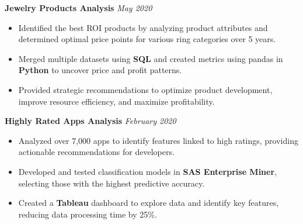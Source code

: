 \documentclass[10pt,a4paper]{article}
\begin{document}







\spacedhrule{0em}{-1em}


\headedsection
{\textbf{Jewelry Products Analysis}}
{{\hfill\emph{May 2020}}}
{
  {
    \begin{itemize}
      \item Identified the best ROI products by analyzing product attributes and determined optimal price points for various ring categories over 5 years.
      \item Merged multiple datasets using \textbf{SQL} and created metrics using pandas in \textbf{Python} to uncover price and profit patterns.
      \item Provided strategic recommendations to optimize product development, improve resource efficiency, and maximize profitability.
    \end{itemize}
  }
}

\headedsection
{\textbf{Highly Rated Apps Analysis}}
{{\hfill\emph{February 2020}}}
{
  {
    \begin{itemize}
      \item Analyzed over 7,000 apps to identify features linked to high ratings, providing actionable recommendations for developers.
      \item Developed and tested classification models in \textbf{SAS Enterprise Miner}, selecting those with the highest predictive accuracy.
      \item Created a \textbf{Tableau} dashboard to explore data and identify key features, reducing data processing time by 25\%.
    \end{itemize}
  }
}
\end{document}
